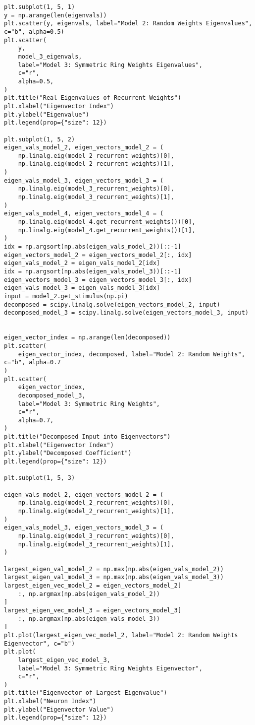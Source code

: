 \documentclass[a4paper, 11pt, oneside]{report}
\begin{document}
\begin{verbatim}
plt.subplot(1, 5, 1)
y = np.arange(len(eigenvals))
plt.scatter(y, eigenvals, label="Model 2: Random Weights Eigenvalues", c="b", alpha=0.5)
plt.scatter(
    y,
    model_3_eigenvals,
    label="Model 3: Symmetric Ring Weights Eigenvalues",
    c="r",
    alpha=0.5,
)
plt.title("Real Eigenvalues of Recurrent Weights")
plt.xlabel("Eigenvector Index")
plt.ylabel("Eigenvalue")
plt.legend(prop={"size": 12})

plt.subplot(1, 5, 2)
eigen_vals_model_2, eigen_vectors_model_2 = (
    np.linalg.eig(model_2_recurrent_weights)[0],
    np.linalg.eig(model_2_recurrent_weights)[1],
)
eigen_vals_model_3, eigen_vectors_model_3 = (
    np.linalg.eig(model_3_recurrent_weights)[0],
    np.linalg.eig(model_3_recurrent_weights)[1],
)
eigen_vals_model_4, eigen_vectors_model_4 = (
    np.linalg.eig(model_4.get_recurrent_weights())[0],
    np.linalg.eig(model_4.get_recurrent_weights())[1],
)
idx = np.argsort(np.abs(eigen_vals_model_2))[::-1]
eigen_vectors_model_2 = eigen_vectors_model_2[:, idx]
eigen_vals_model_2 = eigen_vals_model_2[idx]
idx = np.argsort(np.abs(eigen_vals_model_3))[::-1]
eigen_vectors_model_3 = eigen_vectors_model_3[:, idx]
eigen_vals_model_3 = eigen_vals_model_3[idx]
input = model_2.get_stimulus(np.pi)
decomposed = scipy.linalg.solve(eigen_vectors_model_2, input)
decomposed_model_3 = scipy.linalg.solve(eigen_vectors_model_3, input)


eigen_vector_index = np.arange(len(decomposed))
plt.scatter(
    eigen_vector_index, decomposed, label="Model 2: Random Weights", c="b", alpha=0.7
)
plt.scatter(
    eigen_vector_index,
    decomposed_model_3,
    label="Model 3: Symmetric Ring Weights",
    c="r",
    alpha=0.7,
)
plt.title("Decomposed Input into Eigenvectors")
plt.xlabel("Eigenvector Index")
plt.ylabel("Decomposed Coefficient")
plt.legend(prop={"size": 12})

plt.subplot(1, 5, 3)

eigen_vals_model_2, eigen_vectors_model_2 = (
    np.linalg.eig(model_2_recurrent_weights)[0],
    np.linalg.eig(model_2_recurrent_weights)[1],
)
eigen_vals_model_3, eigen_vectors_model_3 = (
    np.linalg.eig(model_3_recurrent_weights)[0],
    np.linalg.eig(model_3_recurrent_weights)[1],
)

largest_eigen_val_model_2 = np.max(np.abs(eigen_vals_model_2))
largest_eigen_val_model_3 = np.max(np.abs(eigen_vals_model_3))
largest_eigen_vec_model_2 = eigen_vectors_model_2[
    :, np.argmax(np.abs(eigen_vals_model_2))
]
largest_eigen_vec_model_3 = eigen_vectors_model_3[
    :, np.argmax(np.abs(eigen_vals_model_3))
]
plt.plot(largest_eigen_vec_model_2, label="Model 2: Random Weights Eigenvector", c="b")
plt.plot(
    largest_eigen_vec_model_3,
    label="Model 3: Symmetric Ring Weights Eigenvector",
    c="r",
)
plt.title("Eigenvector of Largest Eigenvalue")
plt.xlabel("Neuron Index")
plt.ylabel("Eigenvector Value")
plt.legend(prop={"size": 12})


\end{verbatim}
\end{document}
